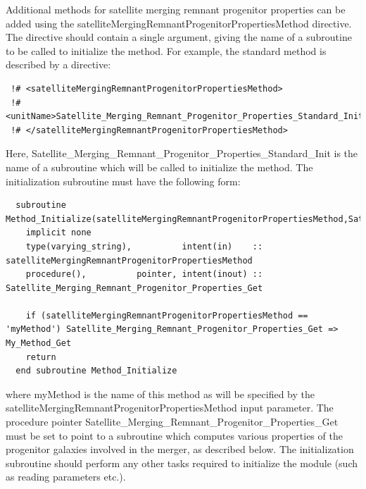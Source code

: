 Additional methods for satellite merging remnant progenitor properties can be added using the {\normalfont \ttfamily satelliteMergingRemnantProgenitorPropertiesMethod} directive. The directive should contain a single argument, giving the name of a subroutine to be called to initialize the method. For example, the {\normalfont \ttfamily standard} method is described by a directive:
\begin{verbatim}
 !# <satelliteMergingRemnantProgenitorPropertiesMethod>
 !#  <unitName>Satellite_Merging_Remnant_Progenitor_Properties_Standard_Init</unitName>
 !# </satelliteMergingRemnantProgenitorPropertiesMethod>
\end{verbatim}
Here, {\normalfont \ttfamily Satellite\_Merging\_Remnant\_Progenitor\_Properties\_Standard\_Init} is the name of a subroutine which will be called to initialize the method. The initialization subroutine must have the following form:
\begin{verbatim}
  subroutine Method_Initialize(satelliteMergingRemnantProgenitorPropertiesMethod,Satellite_Merging_Remnant_Progenitor_Properties_Get)
    implicit none
    type(varying_string),          intent(in)    :: satelliteMergingRemnantProgenitorPropertiesMethod
    procedure(),          pointer, intent(inout) :: Satellite_Merging_Remnant_Progenitor_Properties_Get
    
    if (satelliteMergingRemnantProgenitorPropertiesMethod == 'myMethod') Satellite_Merging_Remnant_Progenitor_Properties_Get => My_Method_Get
    return
  end subroutine Method_Initialize
\end{verbatim}
where {\normalfont \ttfamily myMethod} is the name of this method as will be specified by the {\normalfont \ttfamily satelliteMergingRemnantProgenitorPropertiesMethod} input parameter. The procedure pointer {\normalfont \ttfamily Satellite\_Merging\_Remnant\_Progenitor\_Properties\_Get} must be set to point to a subroutine which computes various properties of the progenitor galaxies involved in the merger, as described below. The initialization subroutine should perform any other tasks required to initialize the module (such as reading parameters etc.).

